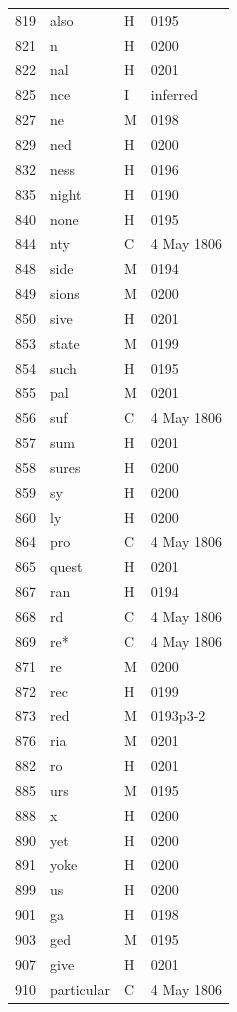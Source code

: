 \begin{longtable}{@{}rlll@{}}
819 & also & H & 0195 \\
821 & n & H & 0200 \\
822 & nal & H & 0201 \\
825 & nce & I & inferred \\
827 & ne & M & 0198 \\
829 & ned & H & 0200 \\
832 & ness & H & 0196 \\
835 & night & H & 0190 \\
840 & none & H & 0195 \\
844 & nty & C & 4 May 1806 \\
848 & side & M & 0194 \\
849 & sions & M & 0200 \\
850 & sive & H & 0201 \\
853 & state & M & 0199 \\
854 & such & H & 0195 \\
855 & pal & M & 0201 \\
856 & suf & C & 4 May 1806 \\
857 & sum & H & 0201 \\
858 & sures & H & 0200 \\
859 & sy & H & 0200 \\
860 & ly & H & 0200 \\
864 & pro & C & 4 May 1806 \\
865 & quest & H & 0201 \\
867 & ran & H & 0194 \\
868 & rd & C & 4 May 1806 \\
869 & re* & C & 4 May 1806 \\
871 & re & M & 0200 \\
872 & rec & H & 0199 \\
873 & red & M & 0193p3-2 \\
876 & ria & M & 0201 \\
882 & ro & H & 0201 \\
885 & urs & M & 0195 \\
888 & x & H & 0200 \\
890 & yet & H & 0200 \\
891 & yoke & H & 0200 \\
899 & us & H & 0200 \\
901 & ga & H & 0198 \\
903 & ged & M & 0195 \\
907 & give & H & 0201 \\
910 & particular & C & 4 May 1806 \\

\end{longtable}
